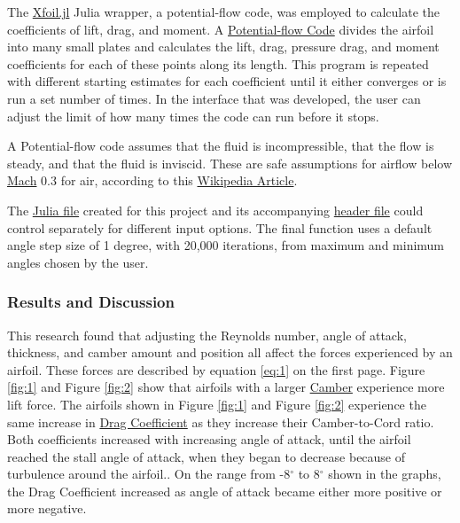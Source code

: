 \documentclass{article}
\begin{document}
The \href{https://docs.juliahub.com/Xfoil/Mlbda/0.4.0/}{Xfoil.jl} Julia wrapper, a potential-flow code, was employed to calculate the coefficients of lift, drag, and moment. A \hyperlink{PFC}{Potential-flow Code} divides the airfoil into many small plates and calculates the lift, drag, pressure drag, and moment coefficients for each of these points along its length. This program is repeated with different starting estimates for each coefficient until it either converges or is run a set number of times. In the interface that was developed, the user can adjust the limit of how many times the code can run before it stops.\newline

A Potential-flow code assumes that the fluid is incompressible, that the flow is steady, and that the fluid is inviscid. These are safe assumptions for airflow below \hyperlink{M}{Mach} 0.3 for air, according to this \href{https://en.wikipedia.org/wiki/Compressible_flow}{Wikipedia Article}. \newline

The \href{https://github.com/JoeSpencer1/497R-Projects/blob/Airfoil-Analysis/Airfoil_Analysis.jl}{Julia file} created for this project and its accompanying \href{https://github.com/JoeSpencer1/497R-Projects/blob/Airfoil-Analysis/Airfoil_Functions.jl}{header file} could control separately for different input options. The final function uses a default angle step size of 1 degree, with 20,000 iterations, from maximum and minimum angles chosen by the user.\newline

\subsubsection*{Results and Discussion}

This research found that adjusting the Reynolds number, angle of attack, thickness, and camber amount and position all affect the forces experienced by an airfoil. These forces are described by equation \ref{eq:1} on the first page. Figure \ref{fig:1} and Figure \ref{fig:2} show that airfoils with a larger \hyperlink{c}{Camber} experience more lift force. The airfoils shown in Figure \ref{fig:1} and Figure \ref{fig:2} experience the same increase in \hyperlink{CD}{Drag Coefficient} as they increase their Camber-to-Cord ratio. Both coefficients increased with increasing angle of attack, until the airfoil reached the stall angle of attack, when they began to decrease because of turbulence around the airfoil.. On the range from -8$^{\circ}$ to 8$^{\circ}$ shown in the graphs, the Drag Coefficient increased as angle of attack became either more positive or more negative.\newline
\end{document}
